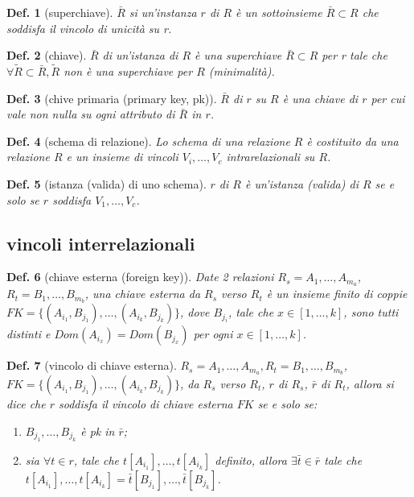 \documentclass{article}
\newtheorem{definition}{Def.}[section]
\begin{document}
\begin{definition}[superchiave]
	$\bar{R}$ si un'instanza $r$ di $R$ è un sottoinsieme $\bar{R} \subset R$
	che soddisfa il vincolo di unicità su r.
\end{definition}

\begin{definition}[chiave]
	$\bar{R}$ di un'istanza di $R$ è una superchiave $\bar{R} \subset R$ per r
	tale che $\forall \tilde{R} \subset \bar{R}, \tilde{R}$ non è una
	superchiave per $R$ (minimalità).
\end{definition}

\begin{definition}[chive primaria (primary key, pk)]
	$\bar{R}$ di $r$ su $R$ è una chiave di $r$ per cui vale non nulla su ogni
	attributo di $\bar{R}$ in $r$.
\end{definition}

\begin{definition}[schema di relazione]
	Lo schema di una relazione $R$ è costituito da una relazione $R$ e un
	insieme di vincoli $V_i, \dots, V_c$ intrarelazionali su $R$.
\end{definition}

\begin{definition}[istanza (valida) di uno schema]
	$r$ di $R$ è un'istanza (valida) di $R$ se e solo se $r$ soddisfa $V_1,
	\dots, V_c$.
\end{definition}

\subsection{vincoli interrelazionali}
\begin{definition}[chiave esterna (foreign key)]
	Date 2 relazioni $R_s = A_1, \dots, A_{m_a}$, $R_t= B_1, \dots, B_{m_b}$,
	una chiave esterna da $R_s$ verso $R_t$ è un insieme finito di coppie $FK =
	\{(A_{i_1}, B_{j_1}), \dots, (A_{i_k}, B_{j_k})\}$, dove $B_{j_i}$, tale che
	$x \in [1, \dots, k]$, sono tutti distinti e $Dom(A_{i_x}) = Dom(B_{j_x})$
	per ogni $x \in [1, \dots, k]$.
\end{definition}

\begin{definition}[vincolo di chiave esterna]
	$R_s=A_1, \dots, A_{m_a}, R_t=B_1, \dots, B_{m_b}$, $FK = \{(A_{i_1},
	B_{j_1}), \dots, (A_{i_k}, B_{j_k})\}$, da $R_s$ verso $R_t$, $r$ di $R_s$,
	$\bar{r}$ di $R_t$, allora si dice che $r$ soddisfa il vincolo di chiave
	esterna $FK$ se e solo se:
	\begin{enumerate}
		\item $B_{j_1}, \dots, B_{j_k}$ è pk in $\bar{r}$;

		\item sia $\forall t \in r$, tale che $t[A_{i_1}], \dots, t[A_{i_k}]$
			definito, allora $\exists \bar{t} \in \bar{r}$ tale che $t[A_{i_1}]
			, \dots, t[A_{i_k}] = \bar{t}[B_{j_1}], \dots, \bar{t}[B_{j_k}]$.
	\end{enumerate}
\end{definition}
\end{document}
